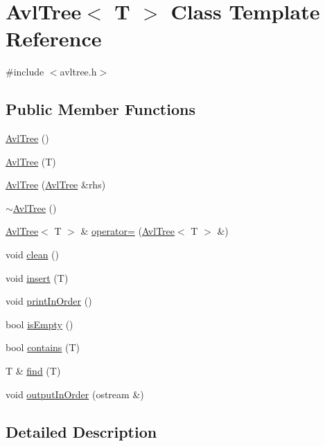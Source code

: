 \hypertarget{classAvlTree}{}\section{Avl\+Tree$<$ T $>$ Class Template Reference}
\label{classAvlTree}


{\ttfamily \#include $<$avltree.\+h$>$}

\subsection*{Public Member Functions}
\begin{DoxyCompactItemize}
\item 
\hyperlink{classAvlTree_a9c433f951e9ac8adf2e5efc623c5dab1}{Avl\+Tree} ()
\item 
\hyperlink{classAvlTree_a12fd9519b87e0ab2a36533bdaeebe400}{Avl\+Tree} (T)
\item 
\hyperlink{classAvlTree_a10dfdf3b57e19b6efd924c75487401a6}{Avl\+Tree} (\hyperlink{classAvlTree}{Avl\+Tree} \&rhs)
\item 
\hyperlink{classAvlTree_aaa39ec526cf6755aea4fa6c7f4535fb8}{$\sim$\+Avl\+Tree} ()
\item 
\hyperlink{classAvlTree}{Avl\+Tree}$<$ T $>$ \& \hyperlink{classAvlTree_af4f30735dc504fc098161ba51f8774e0}{operator=} (\hyperlink{classAvlTree}{Avl\+Tree}$<$ T $>$ \&)
\item 
void \hyperlink{classAvlTree_a1a8cce4ba7b2752e11a4664c0854fc36}{clean} ()
\item 
void \hyperlink{classAvlTree_a463a2d4f0e55e1a7a2934c8254d92d9e}{insert} (T)
\item 
void \hyperlink{classAvlTree_a517bcdf90107a92fc37ea1cae4b88d7c}{print\+In\+Order} ()
\item 
bool \hyperlink{classAvlTree_a79f68d748e25b4f410f3d9e37c04ec74}{is\+Empty} ()
\item 
bool \hyperlink{classAvlTree_a73313a55466ff14a718bcc49b6a72a47}{contains} (T)
\item 
T \& \hyperlink{classAvlTree_a6634bf175be821be1a7929869eab544d}{find} (T)
\item 
void \hyperlink{classAvlTree_a274042708843e9ec80848946085da0de}{output\+In\+Order} (ostream \&)
\end{DoxyCompactItemize}


\subsection{Detailed Description}
